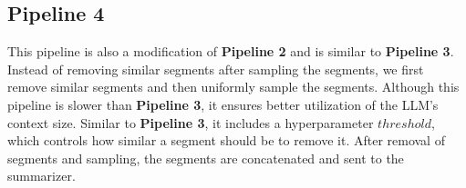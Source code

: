 \subsection*{Pipeline 4}

This pipeline is also a modification of \textbf{Pipeline 2} and is similar to
\textbf{Pipeline 3}.
Instead of removing similar segments after sampling the segments, we first remove similar
segments and then uniformly sample the segments.
Although this pipeline is slower than \textbf{Pipeline 3}, it ensures better utilization of
the LLM's context size.
Similar to \textbf{Pipeline 3}, it includes a hyperparameter $threshold$, which controls
how similar a segment should be to remove it.
After removal of segments and sampling, the segments are concatenated and sent to the
summarizer.
